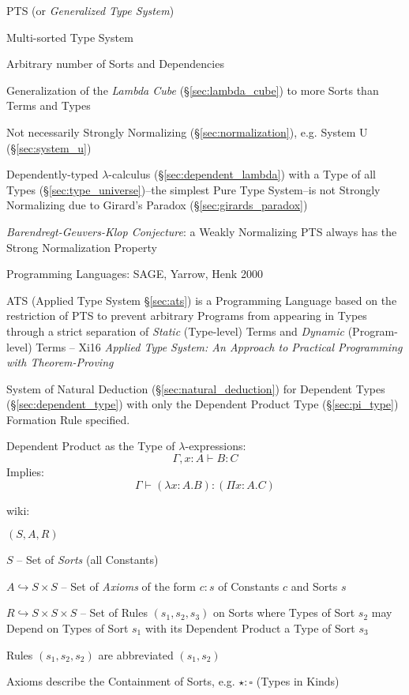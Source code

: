 PTS (or \emph{Generalized Type System})

Multi-sorted Type System

Arbitrary number of Sorts and Dependencies

Generalization of the \emph{Lambda Cube} (\S\ref{sec:lambda_cube}) to
more Sorts than Terms and Types

Not necessarily Strongly Normalizing (\S\ref{sec:normalization}), e.g.
System U (\S\ref{sec:system_u})

Dependently-typed $\lambda$-calculus (\S\ref{sec:dependent_lambda})
with a Type of all Types (\S\ref{sec:type_universe})--the simplest
Pure Type System--is not Strongly Normalizing due to Girard's Paradox
(\S\ref{sec:girards_paradox})

\emph{Barendregt-Geuvers-Klop Conjecture}: a Weakly Normalizing PTS
always has the Strong Normalization Property

Programming Languages: SAGE, Yarrow, Henk 2000


\fist ATS (Applied Type System \S\ref{sec:ats}) is a Programming
Language based on the restriction of PTS to prevent arbitrary Programs
from appearing in Types through a strict separation of \emph{Static}
(Type-level) Terms and \emph{Dynamic} (Program-level) Terms -- Xi16
\emph{Applied Type System: An Approach to Practical Programming with
  Theorem-Proving}


System of Natural Deduction (\S\ref{sec:natural_deduction}) for
Dependent Types (\S\ref{sec:dependent_type}) with only the Dependent
Product Type (\S\ref{sec:pi_type}) Formation Rule specified.

Dependent Product as the Type of $\lambda$-expressions:
\[
  \Gamma,x:A \vdash B:C
\]
Implies:
\[
  \Gamma \vdash (\lambda x:A.B):(\Pi x:A.C)
\]


\asterism


wiki:

$(S,A,R)$

$S$ -- Set of \emph{Sorts} (all Constants)

$A \hookrightarrow S \times S$ -- Set of \emph{Axioms} of the form
$c:s$ of Constants $c$ and Sorts $s$

$R \hookrightarrow S \times S \times S$ -- Set of Rules
$(s_1,s_2,s_3)$ on Sorts where Types of Sort $s_2$ may Depend on Types
of Sort $s_1$ with its Dependent Product a Type of Sort $s_3$

Rules $(s_1,s_2,s_2)$ are abbreviated
$(s_1,s_2)$

Axioms describe the Containment of Sorts, e.g. $\star:\square$ (Types
in Kinds)

